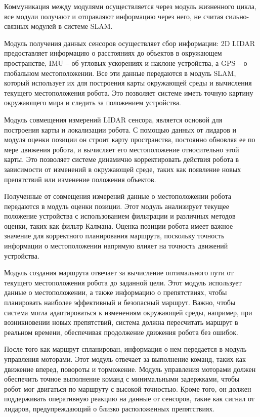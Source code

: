 Коммуникация между модулями осуществляется через модуль жизненного цикла, все
модули получают и отправляют информацию через него, не считая сильно-связных
модулей в системе SLAM. 

Модуль получения данных сенсоров осуществляет сбор информации: 2D LIDAR
предоставляет информацию о расстояниях до объектов в окружающем пространстве,
IMU -- об угловых ускорениях и наклоне устройства, а GPS -- о
глобальном местоположении. Все эти данные передаются в модуль SLAM, который
использует их для построения карты окружающей среды и вычисления текущего
местоположения робота. Это позволяет системе иметь точную картину окружающего
мира и следить за положением устройства.

Модуль совмещения измерений LIDAR сенсора, является основой для построения карты
и локализации робота. С помощью данных от лидаров и модуля оценки позиции он
строит карту пространства, постоянно обновляя ее по мере движения робота, и
вычисляет его местоположение относительно этой карты. Это позволяет системе
динамично корректировать действия робота в зависимости от изменений в окружающей
среде, таких как появление новых препятствий или изменение положения объектов.

Полученные от совмещения измерений данные о местоположении робота передаются в модуль оценки
позиции. Этот модуль анализирует текущее положение устройства с использованием
фильтрации и различных методов оценки, таких как фильтр Калмана. Оценка позиции
робота имеет важное значение для корректного планирования маршрута, поскольку
точность информации о местоположении напрямую влияет на точность движений
устройства.

Модуль создания маршрута отвечает за вычисление оптимального пути от текущего
местоположения робота до заданной цели. Этот модуль использует данные о
местоположении, а также информацию о препятствиях, чтобы планировать наиболее
эффективный и безопасный маршрут. Важно, чтобы система могла адаптироваться к
изменениям окружающей среды, например, при возникновении новых препятствий,
система должна пересчитать маршрут в реальном времени, обеспечивая продолжение
движения робота без ошибок.

После того как маршрут спланирован, информация о нем передается в модуль
управления моторами. Этот модуль отвечает за выполнение команд, таких как
движение вперед, повороты и торможение. Модуль управления моторами должен
обеспечить точное выполнение команд с минимальными задержками, чтобы робот мог
двигаться по маршруту с высокой точностью. Кроме того, он должен поддерживать
оперативную реакцию на данные от сенсоров, такие как сигнал от лидаров,
предупреждающий о близко расположенных препятствиях.

